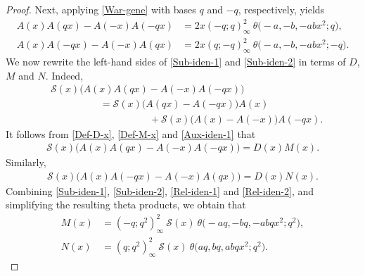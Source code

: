 \documentclass[10pt,a4paper]{amsart}
\begin{document}
\begin{proof}
Next, applying \eqref{War-gene} with bases $q$ and $-q$, respectively, yields
\begin{align}
A(x)A(qx)-A(-x)A(-qx) &=2x(-q;q)_\infty^2\!\:\theta\big({-}a,-b,-abx^2;q\big),
\label{Sub-iden-1}\\
A(x)A(-qx)-A(-x)A(qx) &=2x(q;-q)_\infty^2\!\:\theta\big({-}a,-b,-abx^2;-q\big).
\label{Sub-iden-2}
\end{align}
We now rewrite the left-hand sides of \eqref{Sub-iden-1} and \eqref{Sub-iden-2} in
terms of $D$, $M$ and $N$. Indeed,
\begin{align}
 &\mathscr{S}(x)\big(A(x)A(qx)-A(-x)A(-qx)\big)\nonumber\\
 &\qquad\qquad\quad=\mathscr{S}(x)\big(A(qx)-A(-qx)\big)A(x)\nonumber\\
 &\qquad\qquad\qquad\qquad\qquad+\mathscr{S}(x)\big(A(x)-A(-x)\big)A(-qx).
\label{Der-step-1}
\end{align}
It follows from \eqref{Def-D-x}, \eqref{Def-M-x} and \eqref{Aux-iden-1} that
\begin{align}
\mathscr{S}(x)\big(A(x)A(qx)-A(-x)A(-qx)\big)=D(x)M(x).\label{Rel-iden-1}
\end{align}
Similarly,
\begin{align}
\mathscr{S}(x)\big(A(x)A(-qx)-A(-x)A(qx)\big)=D(x)N(x).\label{Rel-iden-2}
\end{align}
Combining \eqref{Sub-iden-1}, \eqref{Sub-iden-2}, \eqref{Rel-iden-1} and
\eqref{Rel-iden-2}, and simplifying the resulting theta products, we obtain that
\begin{align}
M(x) &=(-q;q^2)_\infty^2\!\:\mathscr{S}(x)\!\:\theta\big({-}aq,-bq,-abqx^2;q^2\big),
\label{Aux-iden-2}\\
N(x) &=(q;q^2)_\infty^2\!\:\mathscr{S}(x)\!\:\theta\big(aq,bq,abqx^2;q^2\big).
\label{Aux-iden-3}
\end{align}


\end{proof}
\end{document}
